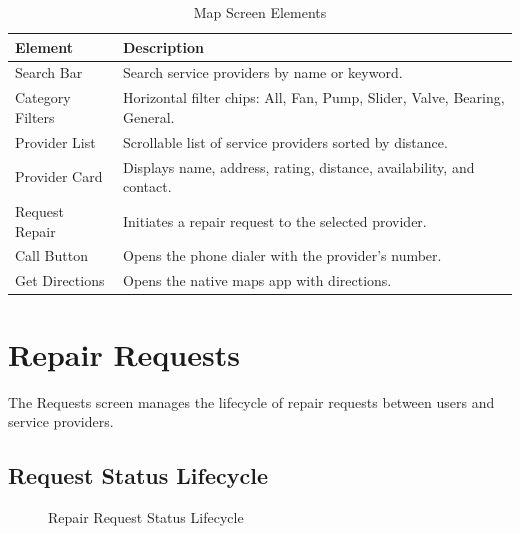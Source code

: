 \documentclass[10pt, a4paper, oneside]{report}
\begin{document}
\begin{table}[H]
\centering
\caption{Map Screen Elements}
\label{tab:map-elements}
\begin{tabularx}{\textwidth}{l X}
  \toprule
  \textbf{Element} & \textbf{Description} \\
  \midrule
  Search Bar          & Search service providers by name or keyword. \\
  Category Filters    & Horizontal filter chips: All, Fan, Pump, Slider, Valve, Bearing, General. \\
  Provider List       & Scrollable list of service providers sorted by distance. \\
  Provider Card       & Displays name, address, rating, distance, availability, and contact. \\
  Request Repair      & Initiates a repair request to the selected provider. \\
  Call Button         & Opens the phone dialer with the provider's number. \\
  Get Directions      & Opens the native maps app with directions. \\
  \bottomrule
\end{tabularx}
\end{table}

\section{Repair Requests}
\label{sec:requests}

The Requests screen manages the lifecycle of repair requests between users and service providers.

\subsection*{Request Status Lifecycle}

\begin{figure}[H]
\centering
{}
\caption{Repair Request Status Lifecycle}
\label{fig:request-lifecycle}
\end{figure}
\end{document}
